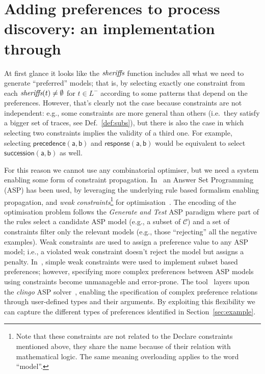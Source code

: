 
\section{Adding preferences to process discovery: an implementation through \asprin}
\label{sec:tool}

At first glance it looks like the ${\textit{sheriffs}}$ function includes all what we need to generate ``preferred'' models; that is, by selecting exactly one constraint from each ${\textit{sheriffs}}(t)\neq\emptyset$ for $t\in L^-$ according to some patterns that depend on the preferences. However, that's clearly not the case because constraints are not independent: e.g., some constraints are more general than others (i.e.\ they satisfy a bigger set of traces, see Def.~\ref{def:subs}), but there is also the case in which selecting two constraints implies the validity of a third one. For example, selecting $\mathsf{precedence(a,b)}$ and $\mathsf{response(a,b)}$ would be equivalent to select $\mathsf{succession(a,b)}$ as well.

For this reason we cannot use any combinatorial optimiser, but we need a system enabling some form of constraint propagation. In~\cite{deviant-tkde} an Answer Set Programming (ASP) has been used, by leveraging the underlying rule based formalism enabling propagation, and \emph{weak constraints}\footnote{Note that these constraints are not related to the Declare constraints mentioned above, they share the name because of their relation with mathematical logic. The same meaning overloading applies to the word ``model''.} for optimisation~\cite{asp-intro,clingo}. The encoding of the optimisation problem follows the \emph{Generate and Test} ASP paradigm where part of the rules select a candidate ASP model (e.g., a subset of $\mathcal{C}$) and a set of constraints filter only the relevant models (e.g., those ``rejecting'' all the negative examples). Weak constraints are used to assign a preference value to any ASP model; i.e., a violated weak constraint doesn't reject the model but assigns a penalty.
%
In~\cite{deviant-tkde}, simple weak constraints were used to implement subset based preferences; however, specifying more complex preferences between ASP models using constraints become unmanageble and error-prone. The \asprin tool~\cite{DBLP:conf/aaai/BrewkaD0S15} layers upon the \emph{clingo} ASP solver~\cite{clingo}, enabling the specification of complex preference relations through user-defined  types and their arguments. By exploiting this flexibility we can capture the different types of preferences identified in Section~\ref{sec:example}.

